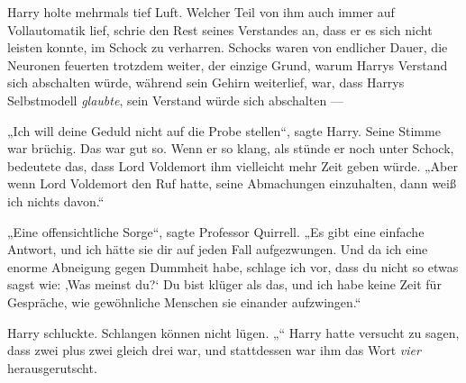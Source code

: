 Harry holte mehrmals tief Luft. Welcher Teil von ihm auch immer auf Vollautomatik lief, schrie den Rest seines Verstandes an, dass er es sich nicht leisten konnte, im Schock zu verharren. Schocks waren von endlicher Dauer, die Neuronen feuerten trotzdem weiter, der einzige Grund, warum Harrys Verstand sich abschalten würde, während sein Gehirn weiterlief, war, dass Harrys Selbstmodell \emph{glaubte}, sein Verstand würde sich abschalten —

„Ich will deine Geduld nicht auf die Probe stellen“, sagte Harry.
Seine Stimme war brüchig. Das war gut so. Wenn er so klang, als stünde er noch unter Schock, bedeutete das, dass Lord Voldemort ihm vielleicht mehr Zeit geben würde.
„Aber wenn Lord Voldemort den Ruf hatte, seine Abmachungen einzuhalten, dann weiß ich nichts davon.“

„Eine offensichtliche Sorge“, sagte Professor Quirrell.
„Es gibt eine einfache Antwort, und ich hätte sie dir auf jeden Fall aufgezwungen.  Und da ich eine enorme Abneigung gegen Dummheit habe, schlage ich vor, dass du nicht so etwas sagst wie: ‚Was meinst du?‘ Du bist klüger als das, und ich habe keine Zeit für Gespräche, wie gewöhnliche Menschen sie einander aufzwingen.“

Harry schluckte. Schlangen können nicht lügen. „“
Harry hatte versucht zu sagen, dass zwei plus zwei gleich drei war, und stattdessen war ihm das Wort \emph{vier} herausgerutscht.

